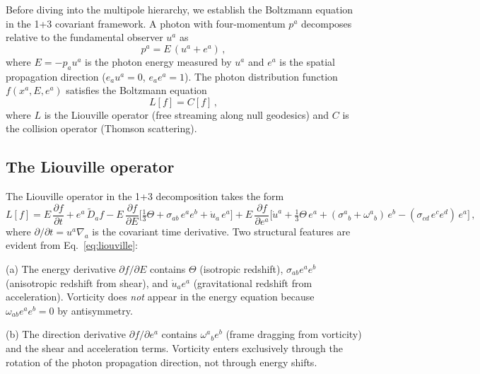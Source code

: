 Before diving into the multipole hierarchy, we establish the
Boltzmann equation in the 1+3 covariant framework.  A photon
with four-momentum $p^a$ decomposes relative to the fundamental
observer $u^a$ as
\begin{equation}\label{eq:photon-decomp}
p^a = E\,(u^a + e^a)\,,
\end{equation}
where $E = -p_a u^a$ is the photon energy measured by $u^a$ and
$e^a$ is the spatial propagation direction ($e_a u^a = 0$,
$e_a e^a = 1$).  The photon distribution function
$f(x^a, E, e^a)$ satisfies the Boltzmann equation
\begin{equation}\label{eq:boltzmann}
L[f] = C[f]\,,
\end{equation}
where $L$ is the Liouville operator (free streaming along null
geodesics) and $C$ is the collision operator (Thomson
scattering).


\subsection{The Liouville operator}\label{sec:liouville}

The Liouville operator in the 1+3 decomposition takes the
form~\cite{EllisVanElst1999,MaartensGE1999}
\begin{equation}\label{eq:liouville}
L[f] = E\,\frac{\partial f}{\partial t}
  + e^a\,\tilde{D}_a f
  - E\,\frac{\partial f}{\partial E}\bigl[
    \tfrac{1}{3}\Theta + \sigma_{ab}\,e^a e^b
    + \dot{u}_a\,e^a
  \bigr]
  + E\,\frac{\partial f}{\partial e^a}\bigl[
    \dot{u}^a + \tfrac{1}{3}\Theta\,e^a
    + (\sigma^a{}_b + \omega^a{}_b)\,e^b
    - (\sigma_{cd}\,e^c e^d)\,e^a
  \bigr]\,,
\end{equation}
where $\partial/\partial t = u^a \nabla_a$ is the covariant
time derivative.  Two structural features are evident from
Eq.~\eqref{eq:liouville}:

(a) The energy derivative $\partial f/\partial E$ contains
$\Theta$ (isotropic redshift), $\sigma_{ab}e^a e^b$ (anisotropic
redshift from shear), and $\dot{u}_a e^a$ (gravitational
redshift from acceleration).  Vorticity does \emph{not} appear
in the energy equation because $\omega_{ab}e^a e^b = 0$ by
antisymmetry.

(b) The direction derivative $\partial f/\partial e^a$ contains
$\omega^a{}_b e^b$ (frame dragging from vorticity) and the shear
and acceleration terms.  Vorticity enters exclusively through
the rotation of the photon propagation direction, not through
energy shifts.


